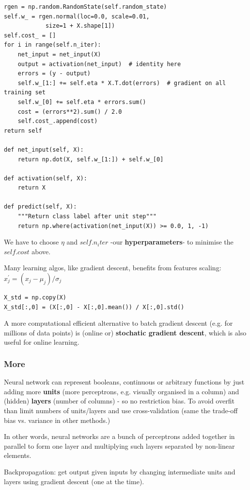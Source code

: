 \documentclass[11pt]{article}
\begin{document}
\begin{lstlisting}
rgen = np.random.RandomState(self.random_state)
self.w_ = rgen.normal(loc=0.0, scale=0.01,
			size=1 + X.shape[1])
self.cost_ = []
for i in range(self.n_iter):
	net_input = net_input(X)
	output = activation(net_input)  # identity here
	errors = (y - output)
	self.w_[1:] += self.eta * X.T.dot(errors)  # gradient on all training set
	self.w_[0] += self.eta * errors.sum()  
	cost = (errors**2).sum() / 2.0
	self.cost_.append(cost)
return self

def net_input(self, X):
    return np.dot(X, self.w_[1:]) + self.w_[0]

def activation(self, X):
    return X

def predict(self, X):
    """Return class label after unit step"""
    return np.where(activation(net_input(X)) >= 0.0, 1, -1)
\end{lstlisting}
We have to choose $\eta$ and $self.n_iter$ -our \textbf{hyperparameters}- to minimise the $self.cost$ above.

Many learning algos, like gradient descent, benefits from features scaling: $x^{'}_j = 
(x_j - \mu_j) / \sigma_j$
\begin{lstlisting}
X_std = np.copy(X)
X_std[:,0] = (X[:,0] - X[:,0].mean()) / X[:,0].std()
\end{lstlisting}

A more computational efficient alternative to batch gradient descent (e.g. for millions of data points) is (online or) \textbf{stochatic gradient descent}, which is also useful for online learning.

\subsubsection*{More}
Neural network can represent booleans, continuous or arbitrary functions by just adding more \textbf{units} (more perceptrons, e.g. visually organised in a column) and (hidden) \textbf{layers} (number of columns) - so no restriction bias. To avoid overfit than limit numbers of units/layers and use cross-validation (same the trade-off bias vs. variance in other methods.)

In other words, neural networks are a bunch of perceptrons added together in parallel to form one layer and multiplying such layers separated by non-linear elements.

Backpropagation: get output given inputs by changing intermediate units and layers using gradient descent (one at the time).
\end{document}
